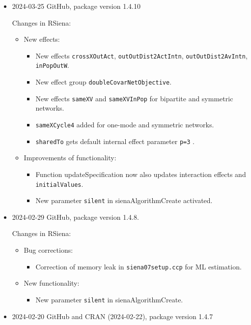 \documentclass[a4paper,fleqn,11pt]{article}
\newcommand{\+}{\, + \,}
\newcommand{\sfn}[1]{\textsf{#1}}
\begin{document}
\begin{small}
\begin{itemize}
\item 2024-03-25 GitHub, package version 1.4.10


Changes in RSiena:
\begin{itemize}
\item New effects:
   \begin{itemize}
  \item New effects \texttt{crossXOutAct}, \texttt{outOutDist2ActIntn},
    \texttt{outOutDist2AvIntn}, \texttt{inPopOutW}.
  \item New effect group \texttt{doubleCovarNetObjective}.
  \item New effects \texttt{sameXV} and \texttt{sameXVInPop} for bipartite
    and symmetric networks.
  \item \texttt{sameXCycle4} added for one-mode and symmetric networks.
  \item \texttt{sharedTo} gets default internal effect parameter \texttt{p=3} .
  \end{itemize}
\item Improvements of functionality:
   \begin{itemize}
  \item Function \sfn{updateSpecification} now also updates interaction effects
    and \texttt{initialValues}.
  \item New parameter \texttt{silent} in \sfn{sienaAlgorithmCreate} activated.
  \end{itemize}
\end{itemize}


\item 2024-02-29 GitHub, package version 1.4.8.


Changes in RSiena:
\begin{itemize}
\item Bug corrections:
   \begin{itemize}
   \item Correction of memory leak in \texttt{siena07setup.ccp} for ML estimation.
    \end{itemize}
\item New functionality:
   \begin{itemize}
   \item New parameter \texttt{silent} in \sfn{sienaAlgorithmCreate}.
    \end{itemize}
\end{itemize}


\item 2024-02-20 GitHub and CRAN (2024-02-22), package version 1.4.7


\end{itemize}
\end{small}
\end{document}
